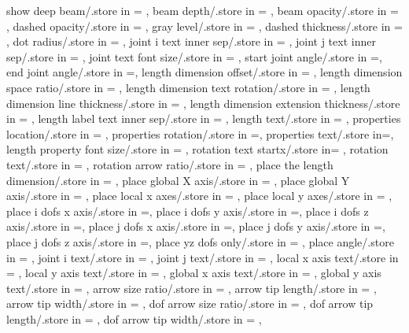 {show deep beam/.store in = \showdeep,
beam depth/.store in = \beamdepth,
beam opacity/.store in = \beamopa,
dashed opacity/.store in = \dashedopa,
gray level/.store in = \graylevel,
dashed thickness/.store in = \dashedthk,
dot radius/.store in = \dotradius,
joint i text inner sep/.store in = \jointinnersepi,
joint j text inner sep/.store in = \jointinnersepj,
joint text font size/.store in = \jointtextfontsize,
start joint angle/.store in =\startjointangle,
end joint angle/.store in =\endjointangle,
length dimension offset/.store in = \lengthdimoffset,
length dimension space ratio/.store in = \lengthdimspaceratio,
length dimension text rotation/.store in = \lengthlabelrotation,
length dimension line thickness/.store in = \lengthdimlinethick,
length dimension extension thickness/.store in = \lengthdimextthick,
length label text inner sep/.store in = \lengthlabeltextinnersep,
length text/.store in = \lengthtext,
properties location/.store in = \propertyloc,
properties rotation/.store in =\propertyrotation,
properties text/.store in=\propertiestext,
length property font size/.store in = \lengthpropfontsize,
rotation text startx/.store in= \rotationanglex,
rotation text/.store in = \rotationtext,
rotation arrow ratio/.store in = \rotationarrowratio,
place the length dimension/.store in = \placelengthdim,
place global X axis/.store in = \placeglobalaxesX,
place global Y axis/.store in = \placeglobalaxesY,
place local x axes/.store in = \placelocalxaxes,
place local y axes/.store in = \placelocalyaxes,
place i dofs x axis/.store in =\placeidofx,
place i dofs y axis/.store in =\placeidofy,
place i dofs z axis/.store in =\placeidofz,
place j dofs x axis/.store in =\placejdofx,
place j dofs y axis/.store in =\placejdofy,
place j dofs z axis/.store in =\placejdofz,
place yz dofs only/.store in = \placeyzdofsonly,
place angle/.store in = \placeangle,
joint i text/.store in = \jointitext,
joint j text/.store in = \jointjtext,
local x axis text/.store in = \localxtext,
local y axis text/.store in = \localytext,
global x axis text/.store in = \globalxtext,
global y axis text/.store in = \globalytext,
arrow size ratio/.store in = \arrsizrat,
arrow tip length/.store in = \arrlen,
arrow tip width/.store in = \arrwid,
dof arrow size ratio/.store in = \dofarrtipsizrat,
dof arrow tip length/.store in = \dofarrtiplen,
dof arrow tip width/.store in = \dofarrtipwid,}

